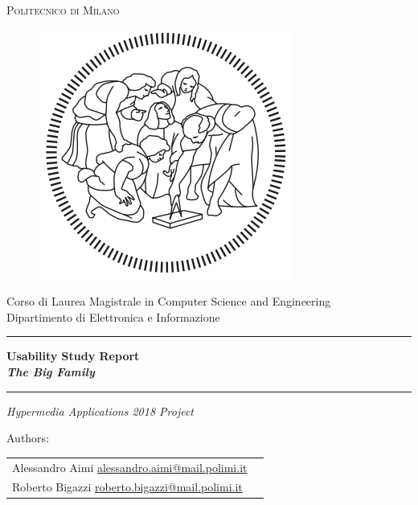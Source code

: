 \documentclass[a4paper,12pt,twoside]{report}
\begin{document}

\thispagestyle{empty}
\enlargethispage{40mm}
\begin{center}
\Large{\textsc{Politecnico di Milano}}\\
\begin{figure}[h]
\begin{center}
\includegraphics[scale=0.25]{images/logoPolimi.png}
\end{center}
\end{figure}
\vspace{-8mm}
\large{Corso di Laurea Magistrale in Computer Science and Engineering}\\
\large{Dipartimento di Elettronica e Informazione}\\
\vspace{15mm}

\begin{center}
\noindent\rule{17cm}{0.4pt}
\end{center}

\vspace{1mm}
{\textbf{\Huge{Usability Study Report}}} \\
\vspace{5mm}
{\textbf{\textit{\Large{The Big Family}}}} \\
\noindent\rule{17cm}{0.4pt}

\vspace{10mm}

{\Large{\textit{Hypermedia Applications 2018 Project}}}


\begin{center}
\vspace{10mm}
Authors:
\vspace{-3mm}
\end{center}
\begin{center}
\begin{tabular}{l l }
Alessandro Aimi \href{mailto:alessandro.aimi@mail.polimi.it}{alessandro.aimi@mail.polimi.it}  \\
Roberto Bigazzi \href{mailto:roberto.bigazzi@mail.polimi.it}{roberto.bigazzi@mail.polimi.it}
\end{tabular}
\end{center}


\end{center}
\end{document}

